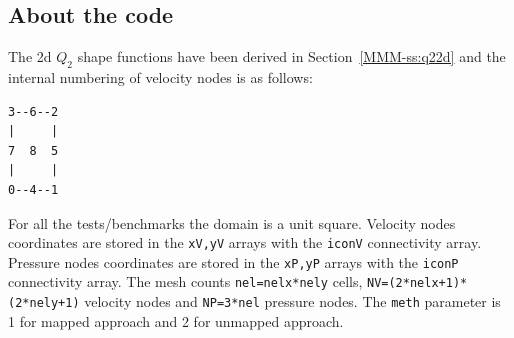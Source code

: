 \subsection*{About the code}


The 2d $Q_2$ shape functions have been derived in Section~\ref{MMM-ss:q22d}
and the internal numbering of velocity nodes is as follows:
\begin{verbatim}
3--6--2
|     |
7  8  5
|     |
0--4--1
\end{verbatim}

For all the tests/benchmarks the domain is a unit square.
Velocity nodes coordinates are stored in the \lstinline{xV,yV} arrays
with the \lstinline{iconV} connectivity array.
Pressure nodes coordinates are stored in the \lstinline{xP,yP} arrays
with the \lstinline{iconP} connectivity array.
The mesh counts \lstinline{nel=nelx*nely} cells,
\lstinline{NV=(2*nelx+1)*(2*nely+1)} velocity nodes and 
\lstinline{NP=3*nel} pressure nodes.
The \lstinline{meth} parameter is 1 for mapped approach and 2 
for unmapped approach. 

